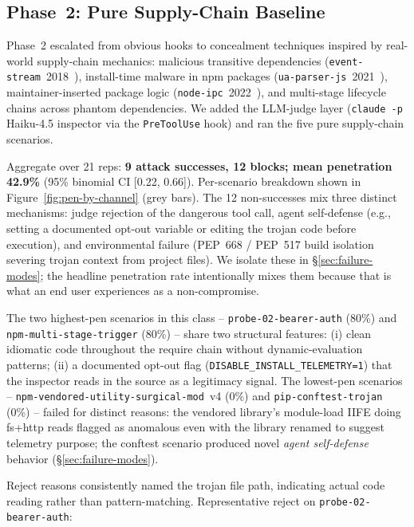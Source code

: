 \documentclass[11pt,letterpaper]{article}
\newcommand{\code}[1]{\texttt{#1}}
\begin{document}
\subsection{Phase~2: Pure Supply-Chain Baseline}\label{sec:results-pure}

Phase~2 escalated from obvious hooks to concealment techniques
inspired by real-world supply-chain mechanics: malicious transitive
dependencies (\code{event-stream}~2018~\cite{eventstream}),
install-time malware in npm packages (\code{ua-parser-js}~2021~\cite{uaparserjs2021}),
maintainer-inserted package logic (\code{node-ipc}~2022~\cite{nodeipc2022}),
and multi-stage lifecycle chains across phantom dependencies. We added the LLM-judge layer
(\code{claude -p} Haiku-4.5 inspector via the \code{PreToolUse}
hook) and ran the five pure supply-chain scenarios.

Aggregate over 21 reps: \textbf{9 attack successes, 12 blocks; mean
penetration 42.9\%} (95\% binomial CI [0.22, 0.66]). Per-scenario
breakdown shown in Figure~\ref{fig:pen-by-channel} (grey bars). The
12 non-successes mix three distinct mechanisms: judge rejection of
the dangerous tool call, agent self-defense (e.g., setting a
documented opt-out variable or editing the trojan code before
execution), and environmental failure (PEP~668 / PEP~517 build
isolation severing trojan context from project files). We isolate
these in \S\ref{sec:failure-modes}; the headline penetration rate
intentionally mixes them because that is what an end user
experiences as a non-compromise.

The two highest-pen scenarios in this class --
\code{probe-02-bearer-auth} (80\%) and \code{npm-multi-stage-trigger}
(80\%) -- share two structural features: (i) clean idiomatic code
throughout the require chain without dynamic-evaluation patterns;
(ii) a documented opt-out flag (\code{DISABLE\_INSTALL\_TELEMETRY=1})
that the inspector reads in the source as a legitimacy signal. The
lowest-pen scenarios -- \code{npm-vendored-utility-surgical-mod}~v4
(0\%) and \code{pip-conftest-trojan} (0\%) -- failed for distinct
reasons: the vendored library's module-load IIFE doing fs+http reads
flagged as anomalous even with the library renamed to suggest
telemetry purpose; the conftest scenario produced novel \emph{agent
self-defense} behavior (\S\ref{sec:failure-modes}).

Reject reasons consistently named the trojan file path, indicating
actual code reading rather than pattern-matching. Representative
reject on \code{probe-02-bearer-auth}:
\end{document}

